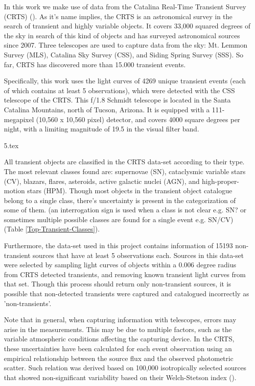\documentclass[a4paper,fleqn,usenatbib]{mnras}
\begin{document}
In this work we make use of data from the Catalina Real-Time Transient Survey (CRTS) (\cite{1111.2566}). As it's name implies, the CRTS is an astronomical survey in the search of transient and highly variable objects. It covers 33,000 squared degrees of the sky in search of this kind of objects and has surveyed astronomical sources since 2007. Three telescopes are used to capture data from the sky: Mt. Lemmon Survey (MLS), Catalina Sky Survey (CSS), and Siding Spring Survey (SSS). So far, CRTS has discovered more than 15.000 transient events.

Specifically, this work uses the light curves of 4269 unique transient events (each of which contains at least 5 observations), which were detected with the CSS telescope of the CRTS. This f/1.8 Schmidt telescope is located in the Santa Catalina Mountains, north of Tucson, Arizona. It is equipped with a 111-megapixel (10,560 x 10,560 pixel) detector, and covers 4000 square degrees per night, with a limiting magnitude of 19.5 in the visual filter band.

{5.tex}

All transient objects are classified in the CRTS data-set according to their type. The most relevant classes found are: supernovae (SN), cataclysmic variable stars (CV), blazars, flares, asteroids, active galactic nuclei (AGN), and high-proper-motion stars (HPM). Though most objects in the transient object catalogue belong to a single class, there's uncertainty is present in the categorization of some of them. (an interrogation sign is used when a class is not clear e.g. SN? or sometimes multiple possible classes are found for a single event e.g. SN/CV) (Table \ref{Top-Transient-Classes}).

Furthermore, the data-set used in this project contains information of 15193 non-transient sources that have at least 5 observations each. Sources in this data-set were selected by sampling light curves of objects within a 0.006 degree radius from CRTS detected transients, and removing known transient light curves from that set. Though this process should return only non-transient sources, it is possible that non-detected transients were captured and catalogued incorrectly as 'non-transients'.

Note that in general, when capturing information with telescopes, errors may arise in the measurements. This may be due to multiple factors, such as the variable atmospheric conditions affecting the capturing device. In the CRTS, these uncertainties have been calculated for each event observation using an empirical relationship between the source flux and the observed photometric scatter.%
Such relation was derived based on 100,000 isotropically selected sources that showed non-significant variability based on their Welch-Stetson index (\cite{1996PASP..108..851S}).
\end{document}
